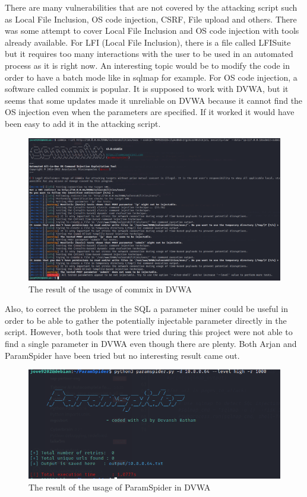 \documentclass[a4paper,12pt,fleqn]{article}
\begin{document}
There are many vulnerabilities that are not covered by the attacking script such as Local File Inclusion, OS code injection, CSRF, File upload and others. There was some attempt to cover Local File Inclusion and OS code injection with tools already available. For LFI (Local File Inclusion), there is a file called LFISuite\cite{LFI} but it requires too many interactions with the user to be used in an automated process as it is right now. An interesting topic would be to modify the code in order to have a batch mode like in sqlmap for example. For OS code injection, a software called commix\cite{OSinjection} is popular. It is supposed to work with DVWA, but it seems that some updates made it unreliable on DVWA because it cannot find the OS injection even when the parameters are specified. If it worked it would have been easy to add it in the attacking script.

\begin{figure}[h]
    \centering
    \includegraphics[scale = 0.4]{images/commix.png}
    \caption{The result of the usage of commix in DVWA}
\end{figure}

Also, to correct the problem in the SQL a parameter miner could be useful in order to be able to gather the potentially injectable parameter directly in the script. However, both tools that were tried during this project were not able to find a single parameter in DVWA even though there are plenty. Both Arjan and ParamSpider have been tried but no interesting result came out.

\begin{figure}[h]
    \centering
    \includegraphics[scale = 0.7]{images/param.png}
    \caption{The result of the usage of ParamSpider in DVWA}
\end{figure}
\end{document}
